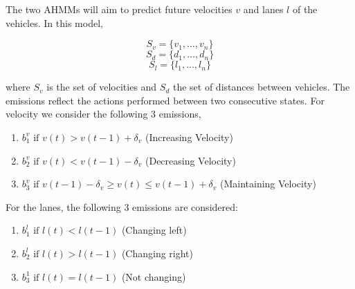 \documentclass[letterpaper, 10 pt, conference]{ieeeconf}  %
\newcommand\NB[1]{$\spadesuit$\footnote{NB: #1}}
\newcommand\RP[1]{$\clubsuit$\footnote{RP: #1}}
\begin{document}
The two AHMMs will aim to predict future velocities $v$ and lanes $l$ of the vehicles. In this model,

\begin{equation}
    S_v = \{v_1,\ldots, v_n\}
\end{equation}
\begin{equation}
    S_d = \{d_1,\ldots,d_n\}
\end{equation}
\begin{equation}
    S_l = \{l_1,\ldots,l_n\}    
\end{equation}

where $S_v$ is the set of velocities and $S_d$ the set of distances between vehicles. The emissions reflect the actions performed between two consecutive states. For velocity we consider the following 3 emissions,
    

\begin{enumerate}
    \item $b_1^v \text{ if } v(t) > v(t-1)+\delta_v$ (Increasing Velocity)
    \item $b_2^v \text{ if } v(t) < v(t-1)-\delta_v$ (Decreasing Velocity)
    \item $b_3^v \text{ if } v(t-1)-\delta_v \geq v(t) \leq v(t-1)+\delta_v$ (Maintaining Velocity)
\end{enumerate}


For the lanes, the following 3 emissions are considered:

\begin{enumerate}
    \item $b_1^l \text{ if } l(t) < l(t-1)$ (Changing left)
    \item $b_2^l \text{ if } l(t) > l(t-1)$ (Changing right)
    \item $b_3^1 \text{ if } l(t) = l(t-1)$ (Not changing)
\end{enumerate}
\end{document}
